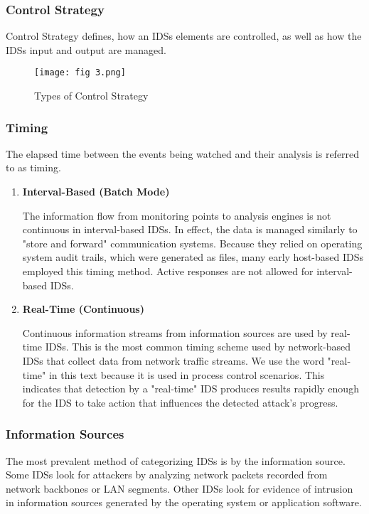 \documentclass[12pt]{article}
\begin{document}
    \subsubsection{Control Strategy}
   \par Control Strategy defines, how an IDSs elements are controlled, as well as how the IDSs input and output are managed.
    \\
    \begin{figure}[h]
        \centering
        \texttt{[image: fig 3.png]}
        \caption{Types of Control Strategy}
    \end{figure}
    
    \subsubsection{Timing}
    \par The elapsed time between the events being watched and their analysis is referred to as timing.
    
    
    \begin{enumerate}
        \item \textbf{Interval-Based (Batch Mode)}
        \par The information flow from monitoring points to analysis engines is not continuous in interval-based IDSs. In effect, the data is managed similarly to "store and forward" communication systems. Because they relied on operating system audit trails, which were generated as files, many early host-based IDSs employed this timing method. Active responses are not allowed for interval-based IDSs.
        \clearpage
        \item \textbf{Real-Time (Continuous)}
        \par Continuous information streams from information sources are used by real-time IDSs. This is the most common timing scheme used by network-based IDSs that collect data from network traffic streams. We use the word "real-time" in this text because it is used in process control scenarios. This indicates that detection by a "real-time" IDS produces results rapidly enough for the IDS to take action that influences the detected attack's progress.
    \end{enumerate}
    
    \subsubsection{Information Sources}
    \par The most prevalent method of categorizing IDSs is by the information source. Some IDSs look for attackers by analyzing network packets recorded from network backbones or LAN segments. Other IDSs look for evidence of intrusion in information sources generated by the operating system or application software.
    \\
    
\end{document}
